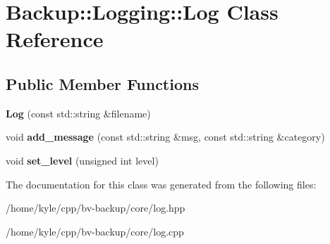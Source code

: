 \hypertarget{class_backup_1_1_logging_1_1_log}{}\section{Backup\+:\+:Logging\+:\+:Log Class Reference}
\label{class_backup_1_1_logging_1_1_log}
\subsection*{Public Member Functions}
\begin{DoxyCompactItemize}
\item 
\mbox{\label{class_backup_1_1_logging_1_1_log_a06207517f314f71ccf7056e3a3ea100a}} 
{\bfseries Log} (const std\+::string \&filename)
\item 
\mbox{\label{class_backup_1_1_logging_1_1_log_a299f6114a1bcf2cd5b64018291bc8e3b}} 
void {\bfseries add\+\_\+message} (const std\+::string \&msg, const std\+::string \&category)
\item 
\mbox{\label{class_backup_1_1_logging_1_1_log_a677c2bcb82015e0b75955a6736dda40a}} 
void {\bfseries set\+\_\+level} (unsigned int level)
\end{DoxyCompactItemize}


The documentation for this class was generated from the following files\+:\begin{DoxyCompactItemize}
\item 
/home/kyle/cpp/bv-\/backup/core/log.\+hpp\item 
/home/kyle/cpp/bv-\/backup/core/log.\+cpp\end{DoxyCompactItemize}
